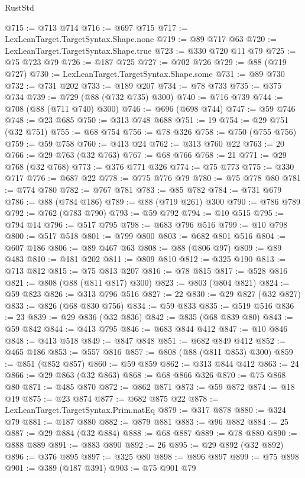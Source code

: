 \begin{lexlean}{RustStd}
\begin{coremodule}
@715 := @713 @714
@716 := @697 @715
@717 := LexLeanTarget.TargetSyntax.Shape.none
@719 := @89 @717 @63
@720 := LexLeanTarget.TargetSyntax.Shape.true
@723 := @330 @720 @11 @79
@725 := @75 @723 @79
@726 := @187 @725
@727 := @702 @726
@729 := @88 (@719 @727)
@730 := LexLeanTarget.TargetSyntax.Shape.some
@731 := @89 @730
@732 := @731 @202
@733 := @189 @207
@734 := @78 @733
@735 := @375 @734
@739 := @729 (@88 (@732 @735) @300)
@740 := @716 @739
@744 := @708 (@88 (@711 @740) @300)
@746 := @696 (@698 @744)
@747 := @59 @746
@748 := @23 @685
@750 := @313 @748 @688
@751 := 19
@754 := @29 @751 (@32 @751)
@755 := @68 @754
@756 := @78 @326
@758 := @750 (@755 @756)
@759 := @59 @758
@760 := @413 @24
@762 := @313 @760 @22
@763 := 20
@766 := @29 @763 (@32 @763)
@767 := @68 @766
@768 := 21
@771 := @29 @768 (@32 @768)
@773 := @376 @771 @326
@774 := @75 @773
@775 := @330 @717
@776 := @687 @22
@778 := @775 @776 @79
@780 := @75 @778 @80
@781 := @774 @780
@782 := @767 @781
@783 := @85 @782
@784 := @731 @679
@786 := @88 (@784 @186)
@789 := @88 (@719 @261) @300
@790 := @786 @789
@792 := @762 (@783 @790)
@793 := @59 @792
@794 := @10 @515
@795 := @794 @14
@796 := @517 @795
@798 := @683 @796 @516
@799 := @10 @798
@800 := @517 @518
@801 := @799 @800
@803 := @682 @801 @516
@804 := @607 @186
@806 := @89 @467 @63
@808 := @88 (@806 @97)
@809 := @89 @483
@810 := @181 @202
@811 := @809 @810
@812 := @325 @190
@813 := @713 @812
@815 := @75 @813 @207
@816 := @78 @815
@817 := @528 @816
@821 := @808 (@88 (@811 @817) @300)
@823 := @803 (@804 @821)
@824 := @59 @823
@826 := @313 @796 @516
@827 := 22
@830 := @29 @827 (@32 @827)
@833 := @826 (@68 @830 @756)
@834 := @59 @833
@835 := @519 @516
@836 := 23
@839 := @29 @836 (@32 @836)
@842 := @835 (@68 @839 @80)
@843 := @59 @842
@844 := @413 @795
@846 := @683 @844 @412
@847 := @10 @846
@848 := @413 @518
@849 := @847 @848
@851 := @682 @849 @412
@852 := @465 @186
@853 := @557 @816
@857 := @808 (@88 (@811 @853) @300)
@859 := @851 (@852 @857)
@860 := @59 @859
@862 := @313 @844 @412
@863 := 24
@866 := @29 @863 (@32 @863)
@868 := @68 @866 @326
@870 := @75 @868 @80
@871 := @485 @870
@872 := @862 @871
@873 := @59 @872
@874 := @18 @19
@875 := @23 @874
@877 := @682 @875 @22
@878 := LexLeanTarget.TargetSyntax.Prim.natEq
@879 := @317 @878
@880 := @324 @79
@881 := @187 @880
@882 := @879 @881
@883 := @96 @882
@884 := 25
@887 := @29 @884 (@32 @884)
@888 := @68 @887
@889 := @78 @880
@890 := @888 @889
@891 := @883 @890
@892 := 26
@895 := @29 @892 (@32 @892)
@896 := @376 @895
@897 := @325 @80
@898 := @896 @897
@899 := @75 @898
@901 := @389 (@187 @391)
@903 := @75 @901 @79

\end{coremodule}
\end{lexlean}
